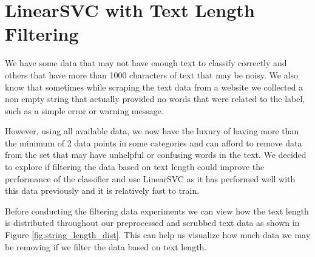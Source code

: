 \section{LinearSVC with Text Length Filtering} 

We have some data that may not have enough text to classify correctly and others that have more than 1000 characters of text that may be noisy. We also know that sometimes while scraping the text data from a website we collected a non empty string that actually provided no words that were related to the label, such as a simple error or warning message.

However, using all available data, we now have the luxury of having more than the minimum of 2 data points in some categories and can afford to remove data from the set that may have unhelpful or confusing words in the text. We decided to explore if filtering the data based on text length could improve the performance of the classifier and use LinearSVC as it has performed well with this data previously and it is relatively fast to train.

Before conducting the filtering data experiments we can view how the text length is distributed throughout our preprocessed and scrubbed text data as shown in Figure \ref{fig:string_length_dist}. This can help us visualize how much data we may be removing if we filter the data based on text length.


